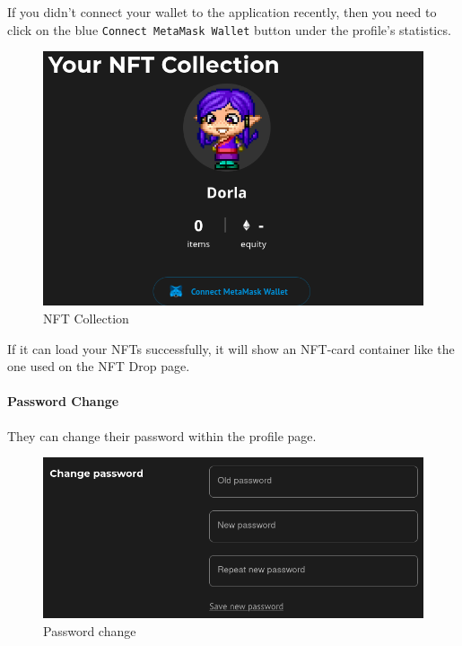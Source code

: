 \documentclass[
]{article}
\begin{document}
If you didn't connect your wallet to the application recently, then you
need to click on the blue \texttt{Connect\ MetaMask\ Wallet} button
under the profile's statistics.

\begin{figure}
\centering
\includegraphics{images/NFT_Collection.png}
\caption{NFT Collection}
\end{figure}\newpage

If it can load your NFTs successfully, it will show an NFT-card
container like the one used on the NFT Drop page.

\hypertarget{password-change}{%
\paragraph{Password Change}\label{password-change}}

They can change their password within the profile page.

\begin{figure}
\centering
\includegraphics{images/profile_change_password.png}
\caption{Password change}
\end{figure}
\end{document}
